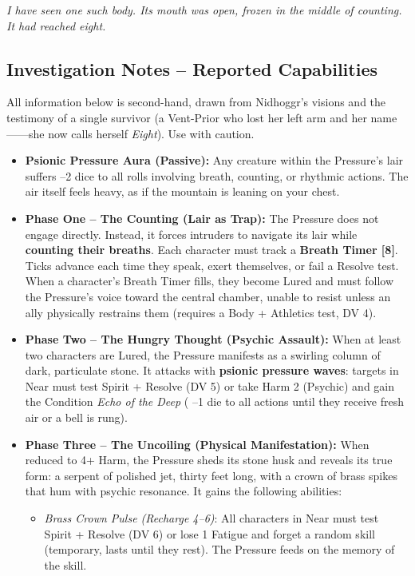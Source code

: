 \textit{I have seen one such body. Its mouth was open, frozen in the middle of counting. It had reached eight.}

\subsection{Investigation Notes -- Reported Capabilities}

All information below is second-hand, drawn from Nidhoggr's visions and the testimony of a single survivor (a Vent-Prior who lost her left arm and her name------she now calls herself \textit{Eight}). Use with caution.

\begin{itemize}
    \item \textbf{Psionic Pressure Aura (Passive):} Any creature within the Pressure's lair suffers --2 dice to all rolls involving breath, counting, or rhythmic actions. The air itself feels heavy, as if the mountain is leaning on your chest.
    \item \textbf{Phase One -- The Counting (Lair as Trap):} The Pressure does not engage directly. Instead, it forces intruders to navigate its lair while \textbf{counting their breaths}. Each character must track a \textbf{Breath Timer [8]}. Ticks advance each time they speak, exert themselves, or fail a Resolve test. When a character's Breath Timer fills, they become Lured and must follow the Pressure's voice toward the central chamber, unable to resist unless an ally physically restrains them (requires a Body + Athletics test, DV 4).
    \item \textbf{Phase Two -- The Hungry Thought (Psychic Assault):} When at least two characters are Lured, the Pressure manifests as a swirling column of dark, particulate stone. It attacks with \textbf{psionic pressure waves}: targets in Near must test Spirit + Resolve (DV 5) or take Harm 2 (Psychic) and gain the Condition \textit{Echo of the Deep} ( --1 die to all actions until they receive fresh air or a bell is rung).
    \item \textbf{Phase Three -- The Uncoiling (Physical Manifestation):} When reduced to 4+ Harm, the Pressure sheds its stone husk and reveals its true form: a serpent of polished jet, thirty feet long, with a crown of brass spikes that hum with psychic resonance. It gains the following abilities:
        \begin{itemize}
            \item \textit{Brass Crown Pulse (Recharge 4--6)}: All characters in Near must test Spirit + Resolve (DV 6) or lose 1 Fatigue and forget a random skill (temporary, lasts until they rest). The Pressure feeds on the memory of the skill.

\end{itemize}
\end{itemize}
